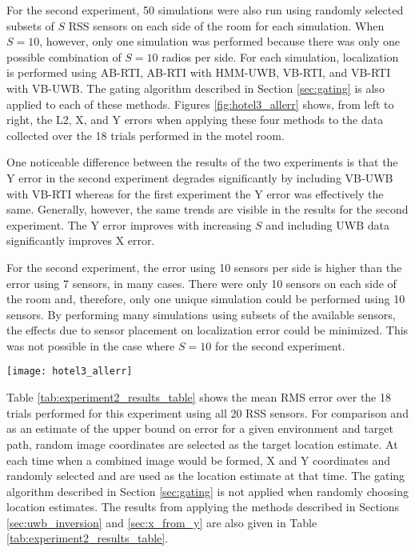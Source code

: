 \documentclass[conference]{IEEEtran}
\begin{document}
For the second experiment, 50 simulations were also run using randomly
selected subsets of $S$ RSS sensors on each side of the room for each
simulation. When $S=10$, however, only one simulation was performed
because there was only one possible combination of $S=10$ radios per
side. For each simulation, localization is performed using AB-RTI,
AB-RTI with HMM-UWB, VB-RTI, and VB-RTI with VB-UWB.
The gating algorithm described in Section \ref{sec:gating} is also
applied to each of these methods. Figures \ref{fig:hotel3_allerr}
shows, from left to right, the L2, X, and Y errors when applying these
four methods to the data collected over the 18 trials performed in the
motel room.

One noticeable difference between the results of the two experiments
is that the Y error in the second experiment degrades significantly by
including VB-UWB with VB-RTI whereas for the first experiment the Y
error was effectively the same. Generally, however, the same trends
are visible in the results for the second experiment. The Y error
improves with increasing $S$ and including UWB data significantly
improves X error.

For the second experiment, the error using 10 sensors per side is
higher than the error using 7 sensors, in many cases. There were only
10 sensors on each side of the room and, therefore, only one unique
simulation could be performed using 10 sensors. By performing many
simulations using subsets of the available sensors, the effects due to
sensor placement on localization error could be minimized. This was
not possible in the case where $S=10$ for the second experiment.

\begin{figure*}[htb]
    \centerline{\texttt{[image: hotel3\_allerr]}}
    \caption{From left to right, the mean RMS L2, X, and Y errors over
      the 18 trials and 50 simulations using random subsets of $S$
      sensors per side of the motel room. When $S=10$, only 1
      simulation was performed.}
    \label{fig:hotel3_allerr}
\end{figure*}

Table \ref{tab:experiment2_results_table} shows the mean RMS error
over the 18 trials performed for this experiment using all 20 RSS
sensors. For comparison and as an estimate of the upper bound on error
for a given environment and target path, random image coordinates are
selected as the target location estimate. At each time when a combined
image would be formed, X and Y coordinates and randomly selected and
are used as the location estimate at that time. The gating algorithm
described in Section \ref{sec:gating} is not applied when randomly
choosing location estimates. The results from applying the methods
described in Sections \ref{sec:uwb_inversion} and \ref{sec:x_from_y}
are also given in Table \ref{tab:experiment2_results_table}.
\end{document}
